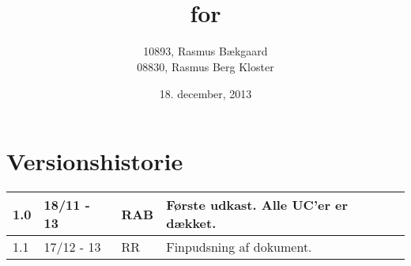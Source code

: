 \documentclass[oneside, 12pt]{memoir}
\title{\DocumentType \\ for \\ \ProjectName}
\date{18. december, 2013}
\author{10893, Rasmus Bækgaard\\08830, Rasmus Berg Kloster}
\begin{document}
\begin{titlingpage}
	
\end{titlingpage}


\section*{Versionshistorie}
\begin{tabular}{p{}|p{}|p{}|p{}}
\hline
1.0 & 18/11 - 13 & RAB & Første udkast. Alle UC'er er dækket. \\ \hline
1.1 & 17/12 - 13 & RR & Finpudsning af dokument. \\ \hline
\end{tabular} 
 


\newpage
\tableofcontents* %

\listoffixmes









%
%
%
%
\end{document}
